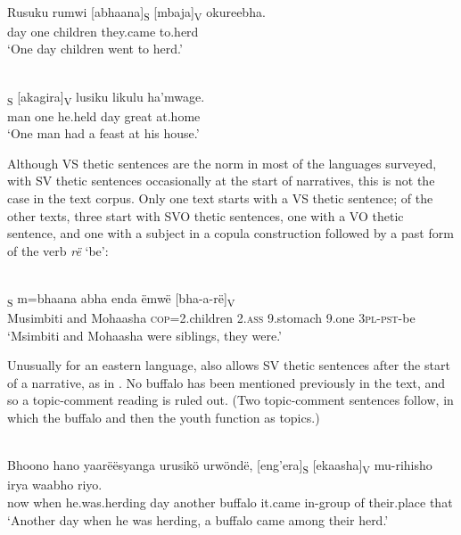 \documentclass[output=paper]{langsci/langscibook}
\begin{document}
\ea\label{ex:27.nicolle}
\\
\gll Rusuku rumwi [abhaana]\textsubscript{S} [mbaja]\textsubscript{V} okureebha.\\
day one {\db}children {\db}they.came to.herd\\
\glt ‘One day children went to herd.’
\z

\ea\label{ex:28.nicolle}
\\
\textsubscript{S} [akagira]\textsubscript{V} lusiku likulu ha’mwage.\\
{\db}man one {\db}he.held day great at.home\\
\glt ‘One man had a feast at his house.’
\z

Although VS thetic sentences are the norm in most of the languages surveyed, with SV thetic sentences occasionally at the start of narratives, this is not the case in the  text corpus. Only one  text starts with a VS thetic sentence; of the other texts, three start with SVO thetic sentences, one with a VO thetic sentence, and one with a subject in a copula construction followed by a past form of the verb \textit{rë} ‘be’:


\ea\label{ex:29.nicolle}
\\
\textsubscript{S} m=bhaana abha enda ëmwë [bha-a-rë]\textsubscript{V}\\
{\db}Musimbiti and Mohaasha \textsc{cop}=2.children 2.\textsc{ass} 9.stomach 9.one {\db}\textsc{3pl-pst}-be\\
\glt ‘Msimbiti and Mohaasha were siblings, they were.’
\z

Unusually for an eastern  language,  also allows SV thetic sentences after the start of a narrative, as in . No buffalo has been mentioned previously in the text, and so a topic-comment reading is ruled out. (Two topic-comment sentences follow, in which the buffalo and then the youth function as topics.)

\ea\label{ex:30.nicolle}
\\
\gll Bhoono hano yaarëësyanga urusikö urwöndë, [eng’era]\textsubscript{S} [ekaasha]\textsubscript{V} mu-rihisho irya waabho riyo.\\
now when he.was.herding day another {\db}buffalo {\db}it.came in-group of their.place that\\
\glt ‘Another day when he was herding, a buffalo came among their herd.’
\z
\end{document}
